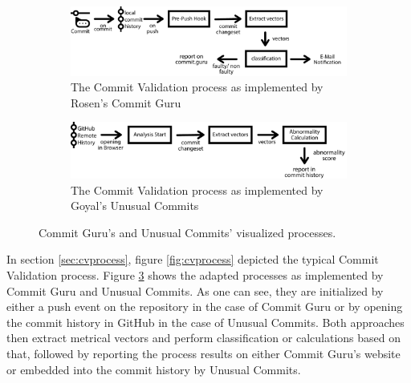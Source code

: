 \begin{figure}[t]
	\centering
	
	\begin{subfigure}[t]{\textwidth}
		\includegraphics[width=\textwidth]{images/commitvalidation-process/commitguruprocess-pdf}
		\caption{The Commit Validation process as implemented by Rosen's Commit Guru \cite{Rosen2015}}
		\label{fig:cvprocess-commitguru}
	\end{subfigure}
	
	\begin{subfigure}[t]{\textwidth}
		\includegraphics[width=\textwidth]{images/commitvalidation-process/unusualcommitsprocess-pdf}
		\caption{The Commit Validation process as implemented by Goyal's Unusual Commits \cite{Goyal2017}}
		\label{fig:cvprocess-unusual}
	\end{subfigure}
	\caption{Commit Guru's and Unusual Commits' visualized processes.}
	\label{fig:cvprocess-guru-unusual}
\end{figure}

In section \ref{sec:cvprocess}, figure \ref{fig:cvprocess} depicted the typical Commit Validation process. Figure \ref{fig:cvprocess-guru-unusual} shows the adapted processes as implemented by Commit Guru and Unusual Commits. As one can see, they are initialized by either a push event on the repository in the case of Commit Guru or by opening the commit history in GitHub in the case of Unusual Commits. Both approaches then extract metrical vectors and perform classification or calculations based on that, followed by reporting the process results on either Commit Guru's website or embedded into the commit history by Unusual Commits.

